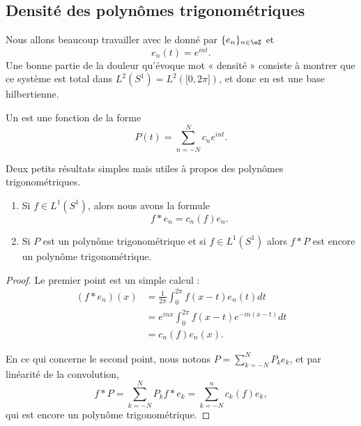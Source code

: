 \subsection{Densité des polynômes trigonométriques}

Nous allons beaucoup travailler avec le  donné par \( \{ e_n \}_{n\in \eZ}\) et
\begin{equation}
    e_n(t)= e^{int}.
\end{equation}
Une bonne partie de la douleur qu'évoque mot « densité » consiste à montrer que ce système est total dans \( L^2(S^1)=L^2(\mathopen[ 0 , 2\pi \mathclose])\), et donc en est une base hilbertienne. 

\begin{definition}
    Un  est une fonction de la forme
    \begin{equation}
        P(t)=\sum_{n=-N}^Nc_n e^{int}.
    \end{equation}
\end{definition}

\begin{lemma}   \label{LemZVfZlms}
    Deux petits résultats simples mais utiles à propos des polynômes trigonométriques.
    \begin{enumerate}
        \item
    Si \( f\in L^1(S^1)\), alors nous avons la formule
    \begin{equation}
        f*e_n=c_n(f)e_n.
    \end{equation}
\item

    Si \( P\) est un polynôme trigonométrique et si \( f\in L^1(S^1)\) alors \( f*P\) est encore un polynôme trigonométrique.
    \end{enumerate}
\end{lemma}

\begin{proof}
    Le premier point est un simple calcul :
    \begin{subequations}
        \begin{align}
            (f*e_n)(x)&=\frac{1}{ 2\pi }\int_0^{2\pi}f(x-t)e_n(t)dt\\
            &= e^{inx}\int_0^{2\pi}f(x-t) e^{-in(x-t)}dt\\
            &=c_n(f)e_n(x).
        \end{align}
    \end{subequations}

    En ce qui concerne le second point, nous notons \( P=\sum_{k=-N}^NP_ke_k\), et par linéarité de la convolution,
    \begin{equation}
        f*P=\sum_{k=-N}^NP_kf*e_k=\sum_{k=-N}^nc_k(f)e_k,
    \end{equation}
    qui est encore un polynôme trigonométrique.
\end{proof}


